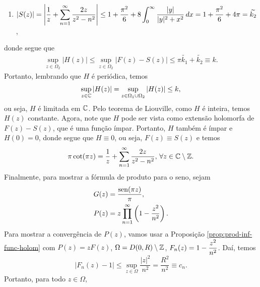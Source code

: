 \begin{exemplo}
\begin{enumerate}
            \item $|S(z)| = \displaystyle{ 
            \left| \frac{1}{z} + \sum_{n=1}^{\infty} \frac{2z}{z^2 - n^2} \right| 
            \leq 1 + \frac{\pi^2}{6} + 8\int_0^{\infty} \frac{|y|}{|y|^2 + x^2} \, dx
            = 1 + \frac{\pi^2}{6} + 4\pi =
            \widetilde{k_2}}$,
        \end{enumerate}
        donde segue que
        \begin{align*}
            \sup_{z\in\Omega_2} |H(z)| \leq 
            \sup_{z\in\Omega_2} |F(z) - S(z)| \leq
            \pi\widetilde{k_1} + \widetilde{k_2} \equiv
            k.
        \end{align*}
        Portanto, lembrando que $H$ é periódica, temos
        \begin{equation*}
            \sup_{z\in\mathbb{C}} |H(z)| =
            \sup_{z\in\Omega_1\cup\Omega_2} |H(z)| \leq
            k,
        \end{equation*}
        ou seja, $H$ é limitada em $\mathbb{C}$.
        Pelo teorema de Liouville, como $H$ é inteira, temos
        $H(z)$ constante. 
        Agora, note que $H$ pode ser vista como extensão holomorfa de $F(z) - S(z)$,
        que é uma função ímpar. Portanto, $H$ também é ímpar e $H(0) = 0$, donde segue 
        que $H\equiv 0$, ou seja, $F(z) \equiv S(z)$ e temos
        \begin{equation*}
            \pi\cot(\pi z) = \frac{1}{z} + \sum_{n=1}^{\infty} \frac{2z}{z^2 - n^2},
            \, \forall z\in\mathbb{C}\setminus\mathbb{Z}.
        \end{equation*}
        Finalmente, para mostrar a fórmula de produto para o seno, sejam
        \begin{align*}
            G(z) &= \frac{\operatorname{sen}(\pi z)}{\pi} , \\
            P(z) &= z\prod_{n=1}^{\infty} \left( 1 - \frac{z^2}{n^2} \right).
        \end{align*}
        Para mostrar a convergência de $P(z)$, vamos usar a 
        Proposição \ref{prop:prod-inf-func-holom} com $P(z) = zF(z)$, 
        $\Omega = D(0,R)\setminus\mathbb{Z}$,
        $F_n(z) = 1 - \displaystyle{ \frac{z^2}{n^2} }$. Daí, temos
        \begin{equation*}
            |F_n(z) - 1| \leq \sup_{z\in\Omega} \frac{|z|^2}{n^2} = \frac{R^2}{n^2}
            \equiv c_n.
        \end{equation*}
        Portanto, para todo $z\in\Omega$,

\end{exemplo}
